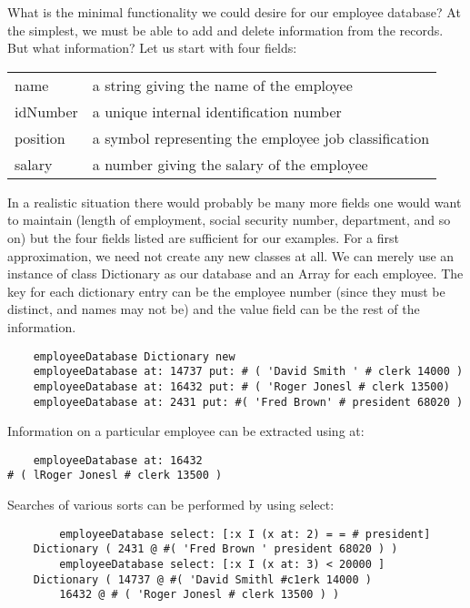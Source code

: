 What is the minimal functionality we could desire for our employee
database? At the simplest, we must be able to add and delete information
from the records. But what information? Let us start with four fields:

\medskip
\begin{tabular}{l l}
    name        & a string giving the name of the employee \\
    idNumber    & a unique internal identification number \\
    position    & a symbol representing the employee job classification \\
    salary      & a number giving the salary of the employee \\
\end{tabular}

\medskip
In a realistic situation there would probably be many more fields one
would want to maintain (length of employment, social security number,
department, and so on) but the four fields listed are sufficient for our
examples. For a first approximation, we need not create any new classes
at all. We can merely use an instance of class Dictionary as our database
and an Array for each employee. The key for each dictionary entry can be
the employee number (since they must be distinct, and names may not
be) and the value field can be the rest of the information.

\begin{lstlisting}
    employeeDatabase Dictionary new
    employeeDatabase at: 14737 put: # ( 'David Smith ' # clerk 14000 )
    employeeDatabase at: 16432 put: # ( 'Roger Jonesl # clerk 13500)
    employeeDatabase at: 2431 put: #( 'Fred Brown' # president 68020 )    
\end{lstlisting}

Information on a particular employee can be extracted using at:

\begin{lstlisting}
    employeeDatabase at: 16432
# ( lRoger Jonesl # clerk 13500 )
\end{lstlisting}

Searches of various sorts can be performed by using select:

\begin{lstlisting}
        employeeDatabase select: [:x I (x at: 2) = = # president]
    Dictionary ( 2431 @ #( 'Fred Brown ' president 68020 ) )
        employeeDatabase select: [:x I (x at: 3) < 20000 ]
    Dictionary ( 14737 @ #( 'David Smithl #c1erk 14000 )
        16432 @ # ( 'Roger Jonesl # clerk 13500 ) )
\end{lstlisting}


